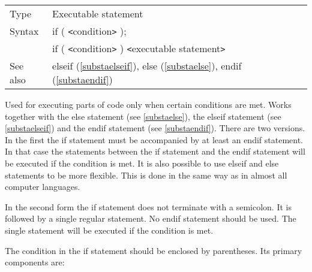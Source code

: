 \noindent \begin{tabular}{ll}
Type & Executable statement\\
Syntax & if ( {\tt<}condition{\tt>} ); \\
       & if ( {\tt<}condition{\tt>} ) {\tt<}executable statement{\tt>}
\\ See also & elseif (\ref{substaelseif}),
              else (\ref{substaelse}),
              endif (\ref{substaendif})
\end{tabular} \vspace{4mm}

\noindent Used for executing parts of code only when certain 
conditions are met. Works together with the 
else statement (see \ref{substaelse}), the elseif 
statement (see \ref{substaelseif}) and the endif statement 
(see \ref{substaendif}). There are two versions. In the first the if 
statement must be accompanied by at least an endif statement. In that case 
the statements between the if statement and the endif statement will be 
executed if the condition is met. It is also possible to use elseif and 
else statements to be more flexible. This is done in the same way as in 
almost all computer languages.

\noindent In the second form the if statement does not terminate with a 
semicolon. It is followed by a single regular statement. 
No endif statement should be used. The single statement will be executed if 
the condition is met.

\noindent The condition in the if statement should be enclosed by 
parentheses. Its primary components are:


